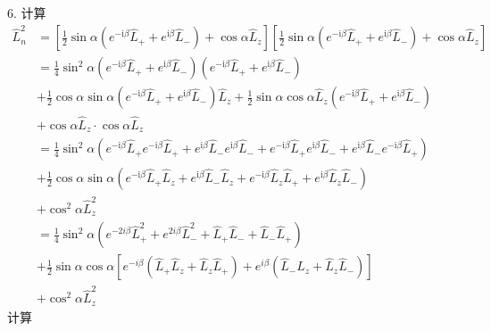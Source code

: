 6.
计算
\begin{equation}
    \begin{aligned}
        \hat{L}_{n}^{2}&=\left[ \frac{1}{2}\sin \alpha \left( e^{-\mathrm{i}\beta}\hat{L}_++e^{\mathrm{i}\beta}\hat{L}_- \right) +\cos \alpha \hat{L}_z \right] \left[ \frac{1}{2}\sin \alpha \left( e^{-\mathrm{i}\beta}\hat{L}_++e^{\mathrm{i}\beta}\hat{L}_- \right) +\cos \alpha \hat{L}_z \right] 
\\
&=\frac{1}{4}\sin ^2\alpha \left( e^{-\mathrm{i}\beta}\hat{L}_++e^{\mathrm{i}\beta}\hat{L}_- \right) \left( e^{-\mathrm{i}\beta}\hat{L}_++e^{\mathrm{i}\beta}\hat{L}_- \right) 
\\
&+\frac{1}{2}\cos \alpha \sin \alpha \left( e^{-\mathrm{i}\beta}\hat{L}_++e^{\mathrm{i}\beta}\hat{L}_- \right) \hat{L}_z+\frac{1}{2}\sin \alpha \cos \alpha \hat{L}_z\left( e^{-\mathrm{i}\beta}\hat{L}_++e^{\mathrm{i}\beta}\hat{L}_- \right) 
\\
&+\cos \alpha \hat{L}_z\cdot \cos \alpha \hat{L}_z
\\
&=\frac{1}{4}\sin ^2\alpha \left( e^{-\mathrm{i}\beta}\hat{L}_+e^{-\mathrm{i}\beta}\hat{L}_++e^{\mathrm{i}\beta}\hat{L}_-e^{\mathrm{i}\beta}\hat{L}_-+e^{-\mathrm{i}\beta}\hat{L}_+e^{\mathrm{i}\beta}\hat{L}_-+e^{\mathrm{i}\beta}\hat{L}_-e^{-\mathrm{i}\beta}\hat{L}_+ \right) 
\\
&+\frac{1}{2}\cos \alpha \sin \alpha \left( e^{-\mathrm{i}\beta}\hat{L}_+\hat{L}_z+e^{\mathrm{i}\beta}\hat{L}_-\hat{L}_z+e^{-\mathrm{i}\beta}\hat{L}_z\hat{L}_++e^{\mathrm{i}\beta}\hat{L}_z\hat{L}_- \right) 
\\
&+\cos ^2\alpha \hat{L}_{z}^{2}
\\
&=\frac{1}{4}\sin ^2\alpha \left( e^{-2i\beta}\hat{L}_{+}^{2}+e^{2i\beta}\hat{L}_{-}^{2}+\hat{L}_+\hat{L}_-+\hat{L}_-\hat{L}_+ \right) 
\\
&+\frac{1}{2}\sin \alpha \cos \alpha \left[ e^{-i\beta}\left( \hat{L}_+\hat{L}_z+\hat{L}_z\hat{L}_+ \right) +e^{i\beta}\left( \hat{L}_-\hat{L}_z+\hat{L}_z\hat{L}_- \right) \right] 
\\
&+\cos ^2\alpha \hat{L}_{z}^{2}
    \end{aligned}
\end{equation}
计算
